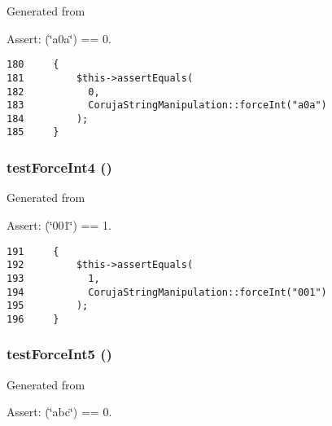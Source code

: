 Generated from \begin{Desc}
\item[Assert:](\char`\"{}a0a\char`\"{}) == 0. \end{Desc}


\begin{Code}\begin{verbatim}180     {
181         $this->assertEquals(
182           0,
183           CorujaStringManipulation::forceInt("a0a")
184         );
185     }
\end{verbatim}
\end{Code}


\hypertarget{class_coruja_string_manipulation_test_dd64dad9b01f0a7a13252030089ee39b}{
\subsubsection[{testForceInt4}]{\setlength{\rightskip}{0pt plus 5cm}testForceInt4 ()}}
\label{class_coruja_string_manipulation_test_dd64dad9b01f0a7a13252030089ee39b}


Generated from \begin{Desc}
\item[Assert:](\char`\"{}001\char`\"{}) == 1. \end{Desc}


\begin{Code}\begin{verbatim}191     {
192         $this->assertEquals(
193           1,
194           CorujaStringManipulation::forceInt("001")
195         );
196     }
\end{verbatim}
\end{Code}


\hypertarget{class_coruja_string_manipulation_test_f122f743ccb289799fdf74a85a197056}{
\subsubsection[{testForceInt5}]{\setlength{\rightskip}{0pt plus 5cm}testForceInt5 ()}}
\label{class_coruja_string_manipulation_test_f122f743ccb289799fdf74a85a197056}


Generated from \begin{Desc}
\item[Assert:](\char`\"{}abc\char`\"{}) == 0. \end{Desc}


